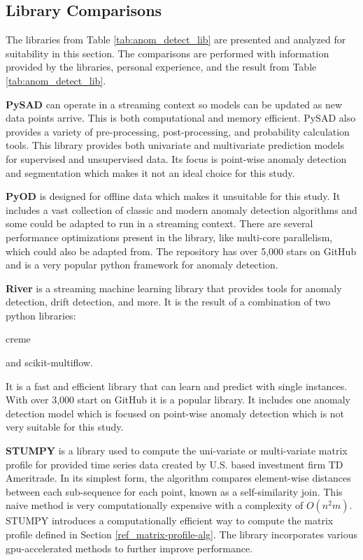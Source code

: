 \subsection{Library Comparisons}

The libraries from Table \ref{tab:anom_detect_lib} are presented and analyzed for suitability in this section. The comparisons are performed with information provided by the libraries, personal experience, and the result from Table \ref{tab:anom_detect_lib}.

\textbf{PySAD} \parencite{pysad} can operate in a streaming context so models can be updated as new data points arrive. This is both computational and memory efficient. PySAD also provides a variety of pre-processing, post-processing, and probability calculation tools. This library provides both univariate and multivariate prediction models for supervised and unsupervised data. Its focus is point-wise anomaly detection and segmentation which makes it not an ideal choice for this study.


\textbf{PyOD} \parencite{zhao2019pyod} is designed for offline data which makes it unsuitable for this study. It includes a vast collection of classic and modern anomaly detection algorithms and some could be adapted to run in a streaming context. There are several performance optimizations present in the library, like multi-core parallelism, which could also be adapted from. The repository has over 5,000 stars on GitHub and is a very popular python framework for anomaly detection.

\textbf{River} \parencite{2020river} is a streaming machine learning library that provides tools for anomaly detection, drift detection, and more. It is the result of a combination of two python libraries:
\begin{inlinelist}
    \item creme
    \item and scikit-multiflow.
\end{inlinelist} It is a fast and efficient library that can learn and predict with single instances. With over 3,000 start on GitHub it is a popular library. It includes one anomaly detection model which is focused on point-wise anomaly detection which is not very suitable for this study.

\textbf{STUMPY} \parencite{law2019stumpy} is a library used to compute the uni-variate or multi-variate matrix profile for provided time series data created by U.S. based investment firm TD Ameritrade. In its simplest form, the algorithm compares element-wise distances between each sub-sequence for each point, known as a self-similarity join. This naive method is very computationally expensive with a complexity of $O(n^2m)$. STUMPY introduces a computationally efficient way to compute the matrix profile defined in Section \ref{ref_matrix-profile-alg}. The library incorporates various gpu-accelerated methods to further improve performance.

